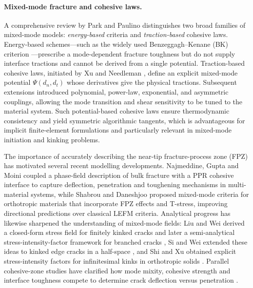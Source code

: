 \documentclass[smallextended]{svjour3}       %
\begin{document}
\paragraph{Mixed-mode fracture and cohesive laws.}
A comprehensive review by Park and Paulino \cite{Park2011Review}
distinguishes two broad families of mixed-mode models:
\emph{energy-based} criteria and \emph{traction-based} cohesive laws.
Energy-based schemes---such as the widely used Benzeggagh--Kenane (BK)
criterion \cite{BenzeggaghKenane1996}---prescribe a mode-dependent
fracture toughness but do not supply interface tractions and cannot be
derived from a single potential. Traction-based cohesive laws, initiated
by Xu and Needleman \cite{XuNeedleman1994}, define an explicit mixed-mode
potential $\Psi(d_n,d_t)$ whose derivatives give the physical tractions.
Subsequent extensions introduced polynomial, power-law, exponential, and
asymmetric couplings, allowing the mode transition and shear sensitivity
to be tuned to the material system. Such potential-based cohesive laws
ensure thermodynamic consistency and yield symmetric algorithmic tangents,
which is advantageous for implicit finite-element formulations and
particularly relevant in mixed-mode initiation and kinking problems.

The importance of accurately describing the near-tip fracture-process zone
(FPZ) has motivated several recent modelling developments. Najmeddine,
Gupta and Moini \cite{NajmeddineGuptaMoini2025} coupled a phase-field
description of bulk fracture with a PPR cohesive interface to capture
deflection, penetration and toughening mechanisms in multi-material
systems, while Shabrou and Daneshjoo \cite{ShabrouDaneshjoo2025} proposed
mixed-mode criteria for orthotropic materials that incorporate FPZ effects
and T-stress, improving directional predictions over classical LEFM
criteria. Analytical progress has likewise sharpened the understanding of
mixed-mode fields: Liu and Wei derived a closed-form stress field for
finitely kinked cracks \cite{Liu2021KinkedStressFields} and later a
semi-analytical stress-intensity-factor framework for branched cracks
\cite{Liu2023BranchedSIF}, Si and Wei extended these ideas to kinked edge
cracks in a half-space \cite{Si2024KinkedEdge}, and Shi and Xu obtained
explicit stress-intensity factors for infinitesimal kinks in orthotropic
solids \cite{Shi2025OrthotropicKinkSIF}. Parallel cohesive-zone studies
have clarified how mode mixity, cohesive strength and interface toughness
compete to determine crack deflection versus penetration
\cite{ParmigianiThouless2006CZMDeflection,Alam2016IncidentAngleCZM,
	Tankasala2017KinkingOrthotropic,ChenDeBorst2022PFRCZM}.
\end{document}
